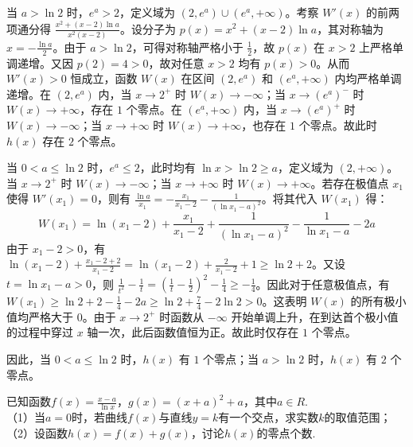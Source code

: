 \begin{solution}
当 $a > \ln 2$ 时，$e^a > 2$，定义域为 $(2, e^a) \cup (e^a, +\infty)$。考察 $W'(x)$ 的前两项通分得 $\frac{x^2 + (x-2)\ln a}{x^2(x-2)}$。设分子为 $p(x) = x^2 + (x-2)\ln a$，其对称轴为 $x = -\frac{\ln a}{2}$。由于 $a > \ln 2$，可得对称轴严格小于 $\frac{1}{2}$，故 $p(x)$ 在 $x > 2$ 上严格单调递增。又因 $p(2) = 4 > 0$，故对任意 $x > 2$ 均有 $p(x) > 0$。从而 $W'(x) > 0$ 恒成立，函数 $W(x)$ 在区间 $(2, e^a)$ 和 $(e^a, +\infty)$ 内均严格单调递增。在 $(2, e^a)$ 内，当 $x \to 2^+$ 时 $W(x) \to -\infty$；当 $x \to (e^a)^-$ 时 $W(x) \to +\infty$，存在 $1$ 个零点。在 $(e^a, +\infty)$ 内，当 $x \to (e^a)^+$ 时 $W(x) \to -\infty$；当 $x \to +\infty$ 时 $W(x) \to +\infty$，也存在 $1$ 个零点。故此时 $h(x)$ 存在 $2$ 个零点。

当 $0 < a \leqslant \ln 2$ 时，$e^a \leqslant 2$，此时均有 $\ln x > \ln 2 \geqslant a$，定义域为 $(2, +\infty)$。当 $x \to 2^+$ 时 $W(x) \to -\infty$；当 $x \to +\infty$ 时 $W(x) \to +\infty$。若存在极值点 $x_1$ 使得 $W'(x_1) = 0$，则有 $\frac{\ln a}{x_1} = -\frac{x_1}{x_1-2} - \frac{1}{(\ln x_1 - a)^2}$。将其代入 $W(x_1)$ 得：
$$W(x_1) = \ln(x_1-2) + \frac{x_1}{x_1-2} + \frac{1}{(\ln x_1 - a)^2} - \frac{1}{\ln x_1 - a} - 2a$$
由于 $x_1 - 2 > 0$，有 $\ln(x_1-2) + \frac{x_1-2+2}{x_1-2} = \ln(x_1-2) + \frac{2}{x_1-2} + 1 \geqslant \ln 2 + 2$。又设 $t = \ln x_1 - a > 0$，则 $\frac{1}{t^2} - \frac{1}{t} = \left(\frac{1}{t} - \frac{1}{2}\right)^2 - \frac{1}{4} \geqslant -\frac{1}{4}$。因此对于任意极值点，有 $W(x_1) \geqslant \ln 2 + 2 - \frac{1}{4} - 2a \geqslant \ln 2 + \frac{7}{4} - 2\ln 2 > 0$。这表明 $W(x)$ 的所有极小值均严格大于 $0$。由于 $x \to 2^+$ 时函数从 $-\infty$ 开始单调上升，在到达首个极小值的过程中穿过 $x$ 轴一次，此后函数值恒为正。故此时仅存在 $1$ 个零点。

因此，当 $0 < a \leqslant \ln 2$ 时，$h(x)$ 有 $1$ 个零点；当 $a > \ln 2$ 时，$h(x)$ 有 $2$ 个零点。
\end{solution}

\begin{example}[零点与导数题]
已知函数$f(x)=\frac{x-a}{\ln x}$，$g(x)=(x+a)^2+a$，其中$a\in R$.\\
（1）当$a=0$时，若曲线$f(x)$与直线$y=k$有一个交点，求实数$k$的取值范围；\\
（2）设函数$h(x)=f(x)+g(x)$，讨论$h(x)$的零点个数.
\end{example}
\begin{solution}

\end{solution}


